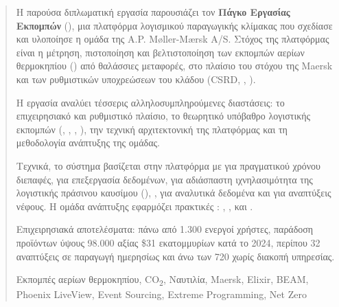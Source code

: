 \begin{abstract}
Η παρούσα διπλωματική εργασία παρουσιάζει τον \textbf{Πάγκο Εργασίας Εκπομπών} (), μια πλατφόρμα λογισμικού παραγωγικής κλίμακας που σχεδίασε και υλοποίησε η ομάδα  της A.P. Møller-Mærsk A/S. Στόχος της πλατφόρμας είναι η μέτρηση, πιστοποίηση και βελτιστοποίηση των εκπομπών αερίων θερμοκηπίου () από θαλάσσιες μεταφορές, στο πλαίσιο του στόχου  της Maersk και των ρυθμιστικών υποχρεώσεων του κλάδου (CSRD, , ).

Η εργασία αναλύει τέσσερις αλληλοσυμπληρούμενες διαστάσεις: το επιχειρησιακό και ρυθμιστικό πλαίσιο, το θεωρητικό υπόβαθρο λογιστικής εκπομπών (, , , ), την τεχνική αρχιτεκτονική της πλατφόρμας και τη μεθοδολογία ανάπτυξης της ομάδας.

Τεχνικά, το σύστημα βασίζεται στην πλατφόρμα  με  για πραγματικού χρόνου διεπαφές,  για  επεξεργασία δεδομένων,  για αδιάσπαστη ιχνηλασιμότητα της λογιστικής πράσινου καυσίμου (), ,  για αναλυτικά δεδομένα και  για αναπτύξεις νέφους. Η ομάδα ανάπτυξης εφαρμόζει πρακτικές : , ,  και .

Επιχειρησιακά αποτελέσματα: πάνω από 1.300 ενεργοί χρήστες, παράδοση  προϊόντων ύψους 98.000  αξίας \$31 εκατομμυρίων  κατά το 2024, περίπου 32 αναπτύξεις σε παραγωγή ημερησίως και άνω των 720  χωρίς διακοπή υπηρεσίας.

\begin{keywords}
Εκπομπές αερίων θερμοκηπίου, CO\textsubscript{2}, Ναυτιλία, Maersk, Elixir, BEAM, Phoenix LiveView, Event Sourcing, Extreme Programming, Net Zero
\end{keywords}
\end{abstract}


